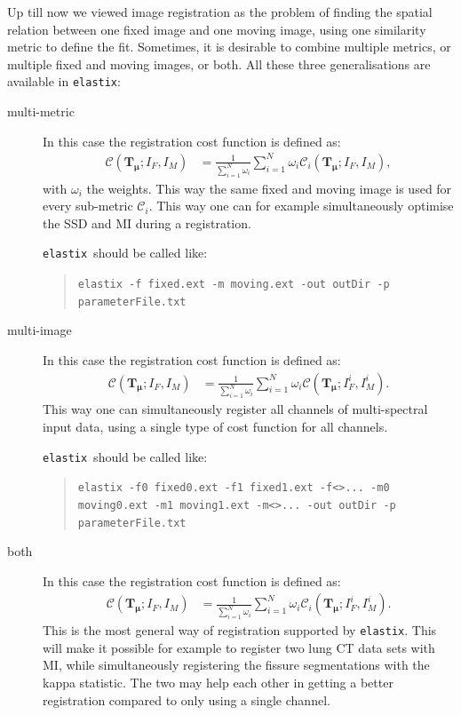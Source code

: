 \documentclass[]{report}
\newcommand{\elastix}{\texttt{elastix}}
\newcommand{\vmu}{\bm{\mu}}
\newcommand{\vTm}{\bm{T}_{\vmu}}
\newcommand{\CC}{\mathcal{C}}
\begin{document}
Up till now we viewed image registration as the problem of finding
the spatial relation between one fixed image and one moving image,
using one similarity metric to define the fit. Sometimes, it is
desirable to combine multiple metrics, or multiple fixed and moving
images, or both. All these three generalisations are available in \elastix:
\begin{description}
\item[multi-metric] In this case the registration cost function is defined
as:
\begin{align}
\CC(\vTm; I_F, I_M) &= \frac{1}{\sum_{i=1}^N \omega_i} \sum_{i=1}^N
\omega_i \CC_i(\vTm; I_F, I_M),
\end{align}
with $\omega_i$ the weights. This way the same fixed and moving
image is used for every sub-metric $\CC_i$. This way one can for
example simultaneously optimise the SSD and MI during a
registration.

\elastix\ should be called like:
\begin{quote}
\texttt{elastix -f fixed.ext -m moving.ext -out outDir -p parameterFile.txt}
\end{quote}

\item[multi-image] In this case the registration cost function is defined
as:
\begin{align}
\CC(\vTm; I_F, I_M) &= \frac{1}{\sum_{i=1}^N \omega_i} \sum_{i=1}^N
\omega_i \CC(\vTm; I_F^i, I_M^i).
\end{align}
This way one can simultaneously register all channels of
multi-spectral input data, using a single type of cost function for
all channels.

\elastix\ should be called like:
\begin{quote}
\texttt{elastix -f0 fixed0.ext -f1 fixed1.ext -f<>... -m0 moving0.ext -m1
moving1.ext -m<>... -out outDir -p parameterFile.txt}
\end{quote}

\item[both] In this case the registration cost function is defined
as:
\begin{align}
\CC(\vTm; I_F, I_M) &= \frac{1}{\sum_{i=1}^N \omega_i} \sum_{i=1}^N
\omega_i \CC_i(\vTm; I_F^i, I_M^i).
\end{align}
This is the most general way of registration supported by \elastix.
This will make it possible for example to register two lung CT data
sets with MI, while simultaneously registering the fissure
segmentations with the kappa statistic. The two may help each other
in getting a better registration compared to only using a single channel.
\end{description}
\end{document}
